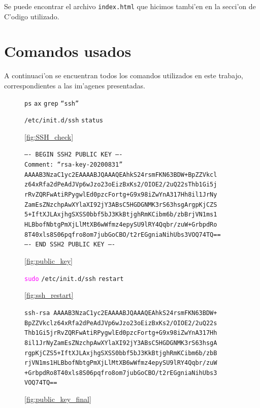 \documentclass[11pt]{article}
\newcommand{\imagecaption}[1]{\vspace{-7pt}\caption*{\char91\ref{fig:#1}\char93}}
\newcommand{\codetext}[2]{\large\texttt{\textcolor{#1}{#2}}}
\begin{document}
	Se puede encontrar el archivo  \texttt{index.html} que hicimos tambi'en en la secci'on de C'odigo utilizado.
		
	\section{Comandos usados}
		A continuaci'on se encuentran todos los comandos utilizados en este trabajo, correspondientes a las im'agenes presentadas.
		
		\begin{figure}[H]
			\centering
			\begin{code-box}
				\codetext{light-blue}{ps} \codetext{light-orange}{ax} \textbar\/ \codetext{light-blue}{grep} \codetext{light-red}{``ssh''}
				
				\codetext{light-blue}{/etc/init.d/ssh} \codetext{light-orange}{status}
			\end{code-box}
			\imagecaption{SSH_check}
		\end{figure}
		
		\begin{figure}[H]
			\centering
			\begin{code-box}
				\codetext{dark-gray}{---- BEGIN SSH2 PUBLIC KEY ----\\
				Comment: ``rsa-key-20200831''\\
				AAAAB3NzaC1yc2EAAAABJQAAAQEAhkS24rsmFKN63BDW+BpZZVkcl
				z64xRfa2dPeAdJVp6wJzo23oEizBxKs2/OIOE2/2uQ22sThb1Gi5j
				rRvZQRFwAtiRPygwlEd0pzcFortg+G9x98iZwYnA317Hh8il1JrNy
				ZamEsZNzchpAwXYlaXI92jY3ABsC5HGDGNMK3rS63hsgArgpKjCZS
				5+IftXJLAxjhgSXSS0bbf5bJ3KkBtjghRmKCibm6b/zbBrjVN1ms1
				HLBbofNbtgPmXjLlMtXB6wWfmz4epySU9lRY4Qqbr/zuW+GrbpdRo
				8T40xls8S06pqfro8om7jubGoCBO/t2rEGgniaNihUbs3VOQ74TQ==\\
				---- END SSH2 PUBLIC KEY ----}
			\end{code-box}
			\imagecaption{public_key}
		\end{figure}
		
		\begin{figure}[H]
			\centering
			\begin{code-box}
				\codetext{fuchsia}{sudo} \codetext{light-blue}{/etc/init.d/ssh} \codetext{light-orange}{restart}
			\end{code-box}
			\imagecaption{ssh_restart}
		\end{figure}
		
		\begin{figure}[H]
			\centering
			\begin{code-box}
				\codetext{dark-gray}{ssh-rsa AAAAB3NzaC1yc2EAAAABJQAAAQEAhkS24rsmFKN63BDW+
				BpZZVkclz64xRfa2dPeAdJVp6wJzo23oEizBxKs2/OIOE2/2uQ22s
				Thb1Gi5jrRvZQRFwAtiRPygwlEd0pzcFortg+G9x98iZwYnA317Hh
				8il1JrNyZamEsZNzchpAwXYlaXI92jY3ABsC5HGDGNMK3rS63hsgA
				rgpKjCZS5+IftXJLAxjhgSXSS0bbf5bJ3KkBtjghRmKCibm6b/zbB
				rjVN1ms1HLBbofNbtgPmXjLlMtXB6wWfmz4epySU9lRY4Qqbr/zuW
				+GrbpdRo8T40xls8S06pqfro8om7jubGoCBO/t2rEGgniaNihUbs3
				VOQ74TQ==}
			\end{code-box}
			\imagecaption{public_key_final}
		\end{figure}
		
\end{document}

